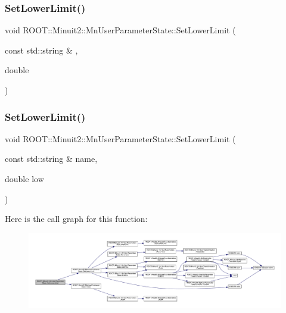 \subsubsection{\texorpdfstring{SetLowerLimit()}{SetLowerLimit()}\hspace{0.1cm}{\footnotesize\ttfamily [3/4]}}
{\footnotesize\ttfamily void R\+O\+O\+T\+::\+Minuit2\+::\+Mn\+User\+Parameter\+State\+::\+Set\+Lower\+Limit (\begin{DoxyParamCaption}\item[{const std\+::string \&}]{,  }\item[{double}]{ }\end{DoxyParamCaption})}

\mbox{\label{classROOT_1_1Minuit2_1_1MnUserParameterState_afc9466eb6db8e8f07309dcd7a760d116}} 
\subsubsection{\texorpdfstring{SetLowerLimit()}{SetLowerLimit()}\hspace{0.1cm}{\footnotesize\ttfamily [4/4]}}
{\footnotesize\ttfamily void R\+O\+O\+T\+::\+Minuit2\+::\+Mn\+User\+Parameter\+State\+::\+Set\+Lower\+Limit (\begin{DoxyParamCaption}\item[{const std\+::string \&}]{name,  }\item[{double}]{low }\end{DoxyParamCaption})}

Here is the call graph for this function\+:\nopagebreak
\begin{figure}[H]
\begin{center}
\leavevmode
\includegraphics[width=350pt]{d3/de0/classROOT_1_1Minuit2_1_1MnUserParameterState_afc9466eb6db8e8f07309dcd7a760d116_cgraph}
\end{center}
\end{figure}
\mbox{\label{classROOT_1_1Minuit2_1_1MnUserParameterState_aab7787768e533471839387ef51a75cbb}} 
